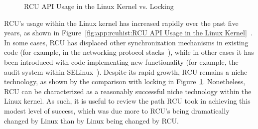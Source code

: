 \begin{figure}[tb]
\begin{center}
\end{center}
\caption{RCU API Usage in the Linux Kernel vs. Locking}
\label{fig:app:rcuhist:RCU API Usage in the Linux Kernel vs. Locking}
\end{figure}

RCU's usage within the Linux kernel has increased rapidly over the past
five years, as shown in
Figure~\ref{fig:app:rcuhist:RCU API Usage in the Linux Kernel}~\cite{PaulEMcKenneyRCUusagePage}.
In some cases, RCU has displaced other synchronization mechanisms
in existing code
(for example,  in the networking protocol
stacks~\cite{Molnar00a,Torvalds2.5.69,Torvalds2.5.70}),
while in other cases it has been introduced with code implementing
new functionality
(for example, the audit system within SELinux~\cite{JamesMorris04b}).
Despite its rapid growth, RCU remains a niche technology,
as shown by the comparison with locking in
Figure~\ref{fig:app:rcuhist:RCU API Usage in the Linux Kernel vs. Locking}.
Nonetheless, RCU can be characterized as a reasonably successful
niche technology within the Linux kernel.
As such, it is useful to review the path RCU took in achieving this
modest level of success, which was due more to RCU's being
dramatically changed by Linux than by Linux being changed by RCU.


